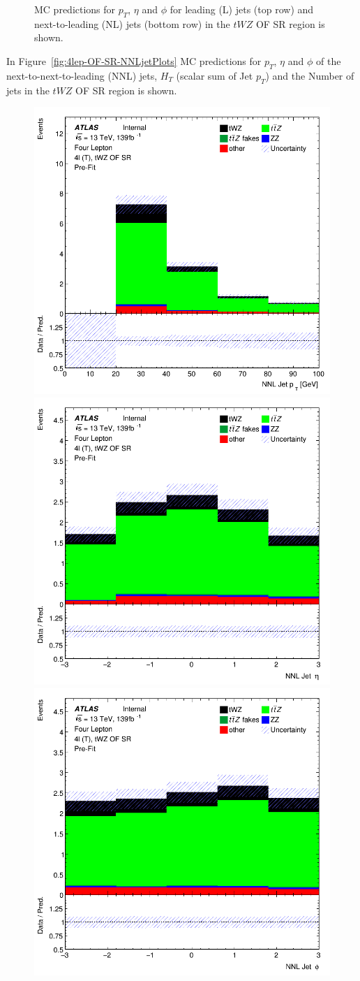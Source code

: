 \begin{figure}[htbp]
\begin{tabular}{ccc}
  \end{tabular}
    \caption{MC predictions for $p_{T}$, $\eta$ and $\phi$ for leading (L) jets (top row) and next-to-leading (NL) jets (bottom row) in the $tWZ$ OF SR region  is shown.}
    \label{fig:4lep-OF-SR-LandNjetPlots} 
\end{figure}

In Figure~\ref{fig:4lep-OF-SR-NNLjetPlots} MC predictions for $p_{T}$, $\eta$ and $\phi$ of the next-to-next-to-leading (NNL) jets, $H_{T}$ (scalar sum of Jet $p_{T}$) and the Number of jets in the $tWZ$ OF SR region is shown.


\begin{figure}[htbp]
 \centering


    \includegraphics[width=.3\textwidth]{figures/PreFitPlots/lep4_tWZ_4T_OF_NNLJet_pt.png} \quad
    \includegraphics[width=.3\textwidth]{figures/PreFitPlots/lep4_tWZ_4T_OF_NNLJet_eta.png} \quad
    \includegraphics[width=.3\textwidth]{figures/PreFitPlots/lep4_tWZ_4T_OF_NNLJet_phi.png}

    \medskip


\end{figure}
